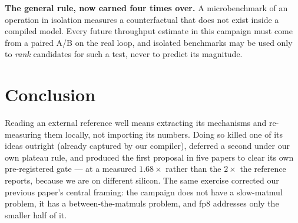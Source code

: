\documentclass{article}
\begin{document}
\textbf{The general rule, now earned four times over.} A microbenchmark of an operation in isolation measures a counterfactual that does not exist inside a compiled model. Every future throughput estimate in this campaign must come from a paired A/B on the real loop, and isolated benchmarks may be used only to \emph{rank} candidates for such a test, never to predict its magnitude.

\section{Conclusion}
Reading an external reference well means extracting its mechanisms and re-measuring them locally, not importing its numbers. Doing so killed one of its ideas outright (already captured by our compiler), deferred a second under our own plateau rule, and produced the first proposal in five papers to clear its own pre-registered gate --- at a measured $1.68\times$ rather than the $2\times$ the reference reports, because we are on different silicon. The same exercise corrected our previous paper's central framing: the campaign does not have a slow-matmul problem, it has a between-the-matmuls problem, and fp8 addresses only the smaller half of it.
\end{document}
